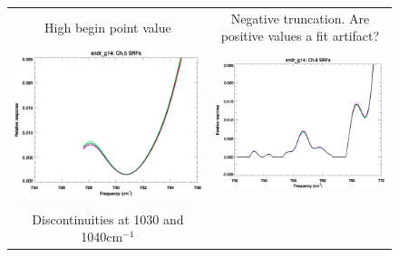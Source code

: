 \begin{figure}[htp]
  \centering
  \begin{tabular}{c c}
    \hspace{1.0em}\textsf{High begin point value} &
    \textsf{Negative truncation. Are positive values a fit artifact?} \\
    \includegraphics[scale=0.5]{graphics/zoom_anomaly/sndr_g14.ch5.srf.eps} &
    \includegraphics[scale=0.5]{graphics/zoom_anomaly/sndr_g14.ch6.srf.eps} \\\\
    \hspace{1.0em}\textsf{Discontinuities at 1030 and 1040cm$^{-1}$} &

\end{tabular}
\end{figure}
